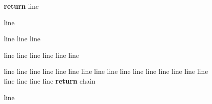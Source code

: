 \documentclass{article}
\begin{document}
\begin{figure*}[tb]
\begin{minipage}{0.56\textwidth}
\begin{algorithm}[H]
\begin{algorithmic}[1]
    \STATE \textbf{return} line

  \end{algorithmic}
  \end{algorithm}
  \vspace{-18px}
  \end{minipage}\hspace{8px}
  \begin{minipage}{0.42\textwidth}

  \vspace{-10px}
  \begin{algorithm}[H]
    \caption{{\color{blue}line}}
    \label{alg:rpc}
  \begin{algorithmic}[1]
    \REQUIRE line
    \STATE line
      \STATE line
    \ENDFOR

      \STATE line
        \STATE line
        \STATE line
        \STATE \hspace{16px} line
        \STATE line
      \ENDFOR
      \STATE line
    \ENDWHILE

  \end{algorithmic}
  \end{algorithm}
  \vspace{-18px}
  \begin{algorithm}[H]
    \caption{{\color{blue}line}}
    \label{alg:replace}
  \begin{algorithmic}[1]
    \REQUIRE line
    \STATE line
    \STATE line
    \STATE line
    \STATE \hspace{8px} line
    \STATE line
    \STATE line
      \STATE \hspace{-4px} line
      \STATE \hspace{-4px} line
      \STATE \hspace{4px} line
      \STATE \hspace{4px} line
      \STATE \hspace{4px} line
      \STATE \hspace{4px} line
      \STATE \hspace{4px} line
      \STATE \hspace{4px} line
      \STATE \hspace{-4px} line
      \STATE \hspace{4px} line
      \STATE \hspace{4px} line
      \STATE \hspace{12px} line
      \STATE \hspace{4px} line
    \ENDWHILE
    \STATE \textbf{return} chain
  \end{algorithmic}
  \end{algorithm}
  \vspace{-18px}\end{minipage}
  \vspace{-5pt}
\end{figure*}
\end{document}
